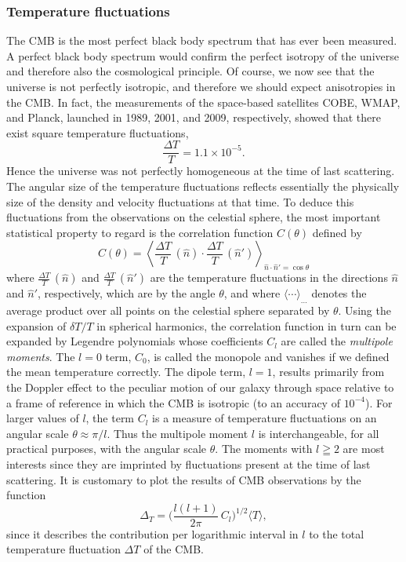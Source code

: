 \subsubsection{Temperature fluctuations}
The CMB is the most perfect black body spectrum that has ever been measured. A perfect black body spectrum would confirm the perfect isotropy of the universe and therefore also the cosmological principle.
Of course, we now see that the universe is not perfectly isotropic, and therefore we should expect anisotropies in the CMB. In fact, the measurements of the  space-based satellites COBE, WMAP, and Planck, launched in 1989, 2001, and 2009, respectively, showed that there exist square temperature fluctuations,
\begin{equation}
	\frac{\Delta T}{T}
	= 1.1 \times 10^{-5}
	.
\end{equation}
Hence the universe was not perfectly homogeneous at the time of last scattering. The angular size of the temperature fluctuations reflects essentially the physically size of the density and velocity fluctuations at that time.
To deduce this fluctuations from the observations on the celestial sphere, the most important statistical property to regard is the correlation function $C(\theta)$ defined by
\begin{equation}
	C(\theta)
	= \left\langle 
		\frac{\Delta T}{T} \,(\hat n) \cdot
		\frac{\Delta T}{T} \,(\hat n')
	\right\rangle_{\hat n \cdot \hat n' = \cos \theta}
\end{equation}
where $\frac{\Delta T}{T} \,(\hat n)$ and $\frac{\Delta T}{T} \,(\hat n')$
are the temperature fluctuations in the directions $\hat n$ and $\hat n'$, respectively, which are by the angle $\theta$, and where $\langle \cdots \rangle_{\ldots}$ denotes the average product over all points on the celestial sphere separated by $\theta$.
Using the expansion of $\delta T/T$ in spherical harmonics, the correlation function in turn can be expanded by Legendre polynomials whose coefficients $C_l$ are called the \emph{multipole moments}. The $l=0$ term, $C_0$, is called the monopole and vanishes if we defined the mean temperature correctly. The dipole term, $l=1$, results primarily from the Doppler effect to the peculiar motion of our galaxy through space relative to a frame of reference in which the CMB is isotropic (to an accuracy of $10^{-4}$). 
For larger values of $l$, the term $C_l$ is a measure of temperature fluctuations on an angular scale 
$\theta \approx \pi / l$. 
Thus the multipole moment $l$ is interchangeable, for all practical purposes, with the angular scale $\theta$. The moments with $l \geqq 2$ are most interests since they are imprinted by fluctuations present at the time of last scattering.
It is customary to plot the results of CMB observations by the function
\begin{equation}
	\Delta_T
	= \Big( \frac{l (l+1)}{2 \pi} \, C_l \Big)^{1/2} \langle T \rangle,
\end{equation}
since it describes the contribution per logarithmic interval in $l$ to the total temperature fluctuation $\Delta T$ of the CMB.

